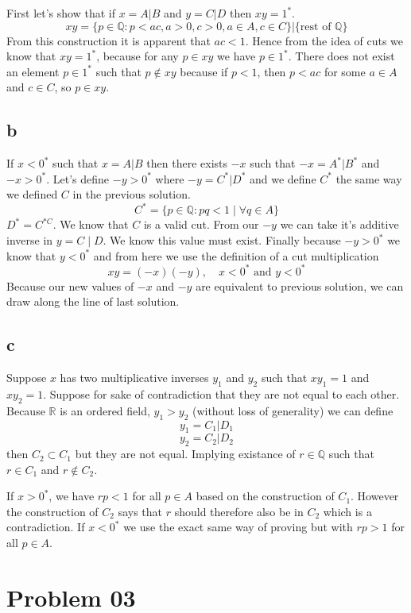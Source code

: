 \documentclass[letter, 12pt]{article}
\begin{document}
	First let's show that if $x = A | B $ and $y = C| D$ then $xy = 1^{*}$. 
	\[
		xy = \{p \in  \mathbb{Q} : p < ac, a > 0, c> 0, a \in A, c \in C \} | 
		\{\text{rest of } \mathbb{Q} \} 
	\]
	From this construction it is apparent that $ac < 1$. Hence from the idea of cuts we know that $x y = 1^{*}$, because for any $p \in  x y$ we have $p \in 1^{*}$. There does not exist an element $p \in 1^{*}$ such that $p \not\in xy $ because if $p < 1$, then $p < ac$ for some $a \in A$ and $c \in C$, so $p \in  xy$. 

	\subsection{b} 
	If $x< 0^{*}$ such that $x = A |B$ then there exists $-x$ such that $-x = A^{*} | B^{*}$ and $-x > 0^{*}$. Let's define $- y > 0^{*}$ where $- y = C^{*} | D^{*}$ and we define $C^{*}$ the same way we defined $C$ in the previous solution. 
	\[
	C ^{*} = \{p \in \mathbb{Q} : pq < 1  \mid \forall q \in A\} 
	\] 
	$D^{*} = C^{*C}$. We know that $C$ is a valid cut. From our $-y$ we can take it's additive inverse in $y = C  \mid D$. We know this value must exist. Finally because $-y > 0^{*}$ we know that $y < 0^{*}$ and from here we use the definition of a cut multiplication 
	\[
	x y = (-x) (-y) , \quad x < 0^{*} \text{ and } y < 0^{*}
	\] 
	Because our new values of $-x $ and $-y$ are equivalent to previous solution, we can draw along the line of last solution. 

	\subsection{c}
	Suppose $x$ has two multiplicative inverses $y_1$ and $y_2$ such that $xy_1 = 1$ and $x y_2 = 1$. Suppose for sake of contradiction that they are not equal to each other. Because $\mathbb{R}$ is an ordered field, $y_1 > y_2$ (without loss of generality) we can define
	\[
	y_1 = C_1 | D_1
	\] \[
	y_2 = C_2 | D_2
	\] 
	then $C_2 \subset C_1$ but they are not equal. Implying existance of $r \in \mathbb{Q}$ such that $r \in  C_1$ and $r \not\in C_2$. 

	If $x > 0^{*}$, we have $rp < 1$ for all $p \in A$ based on the construction of $C_1$. However the construction of $C_2$ says that $r$ should therefore also be in $C_2$ which is a contradiction. If $x< 0^{*}$ we use the exact same way of proving but with $rp > 1$ for all $p \in A$. 
\newpage
\section{Problem 03}
\end{document}
